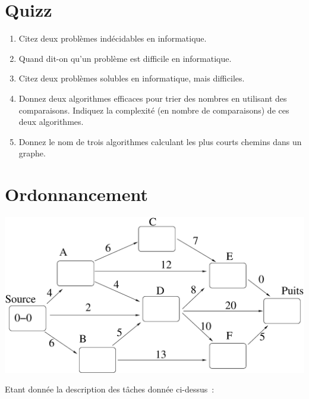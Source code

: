 \documentclass[11pt]{article}
\begin{document}
\section{Quizz}

\begin{enumerate}
\item Citez deux problèmes indécidables en informatique.

\item  Quand dit-on qu'un problème est difficile en informatique.

\item  Citez deux problèmes solubles en informatique, mais difficiles.

\item  Donnez deux algorithmes efficaces pour trier des nombres  en utilisant des comparaisons. Indiquez la complexité (en nombre de comparaisons) de ces deux algorithmes.

\item   Donnez le nom de trois algorithmes calculant les plus courts chemins dans un graphe.
\end{enumerate}

\section{Ordonnancement}

\begin{center}
\includegraphics[width=0.85\linewidth]{critique2.eps}
\end{center}


Etant donnée la description des tâches donnée ci-dessus~: 
\end{document}
